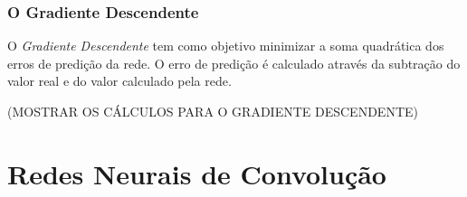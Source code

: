\subsubsection{O Gradiente Descendente}
\label{sec:RedesNeurais:retropropagação:gradientedescendente}

O \emph{Gradiente Descendente} tem como objetivo minimizar a soma quadrática dos erros de predição da rede. O erro de predição é calculado através da subtração do valor real e do valor calculado pela rede.

(MOSTRAR OS CÁLCULOS PARA O GRADIENTE DESCENDENTE)

\section{Redes Neurais de Convolução}

